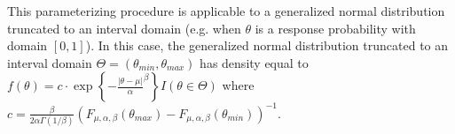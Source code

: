 \documentclass[12pt]{article}
\begin{document}

This parameterizing procedure is applicable to a generalized normal distribution truncated to an interval domain (e.g. when $\theta$ is a response probability with domain $[0,1]$). In this case, the generalized normal distribution truncated to an interval domain $\Theta=(\theta_{min},\theta_{max})$ has density equal to $f(\theta)=c\cdot\exp\left\{-\frac{|\theta-\mu|}{\alpha}^{\beta}\right\}{I(\theta\in \Theta)}$ where $c=\frac{\beta}{2\alpha \Gamma(1/\beta)}({F_{\mu,\alpha,\beta}(\theta_{max})-F_{\mu,\alpha,\beta}(\theta_{min})})^{-1}$.
\end{document}
